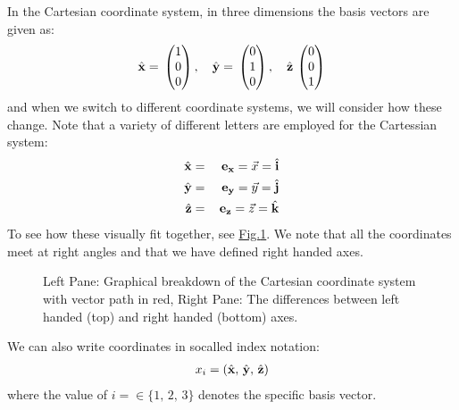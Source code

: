 \documentclass[letterpaper,10pt,english]{jupyterBook}
\begin{document}
\sphinxAtStartPar
In the Cartesian coordinate system, in three dimensions the basis vectors are given as:
\begin{equation*}
\begin{split}\hat{\bf x} = \,\begin{pmatrix}
 1 \\
 0 \\
 0 
\end{pmatrix}, \quad 
\hat{\bf y} = \,\begin{pmatrix}
 0 \\
 1 \\
 0 
\end{pmatrix}, \quad 
\hat{\bf z} \,\begin{pmatrix}
 0 \\
 0 \\
 1 
\end{pmatrix}\end{split}
\end{equation*}
\sphinxAtStartPar
and when we switch to different coordinate systems, we will consider how these change.  Note that a variety of different letters are employed for the Cartessian system:
\begin{equation*}
\begin{split}\hat{\bf x} &=&\, {\bf e_x} = \vec{x} = \hat{\bf i}\\
\hat{\bf y} &=&\, {\bf e_y} = \vec{y} = \hat{\bf j}\\
\hat{\bf z} &=&\, {\bf e_z} = \vec{z} = \hat{\bf k}\end{split}
\end{equation*}
\sphinxAtStartPar
To see how these visually fit together, see \hyperref[\detokenize{VectorCalculus/vectoralgebra:cartcoords}]{Fig.\@ \ref{\detokenize{VectorCalculus/vectoralgebra:cartcoords}}}.  We note that all the coordinates meet at right angles and that we have defined right handed axes.

\begin{figure}[htbp]
\centering
\capstart

\noindent{}
\caption{Left Pane: Graphical breakdown of the Cartesian coordinate system with vector path in red,
Right Pane: The differences between left handed (top) and right handed (bottom) axes.}\label{\detokenize{VectorCalculus/vectoralgebra:cartcoords}}\end{figure}

\sphinxAtStartPar
We can also write coordinates in so\sphinxhyphen{}called index notation:
\begin{equation*}
\begin{split}x_i = \left(\hat{\bf x},\, \hat{\bf y},\, \hat{\bf z}\right)\end{split}
\end{equation*}
\sphinxAtStartPar
where the value of \(i = \in \{1,\,2,\,3\}\) denotes the specific basis vector.
\end{document}
